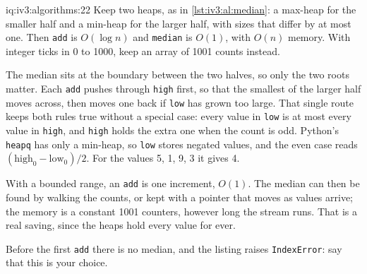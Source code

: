 \begin{solution}{iq:iv3:algorithms:22}
Keep two heaps, as in \cref{lst:iv3:al:median}: a max-heap for the smaller half and a min-heap for the larger half, with sizes that differ by at most one. Then \texttt{add} is $O(\log n)$ and \texttt{median} is $O(1)$, with $O(n)$ memory. With integer ticks in 0 to 1000, keep an array of 1001 counts instead.
\label{lst:iv3:al:median}

The median sits at the boundary between the two halves, so only the two roots matter. Each \texttt{add} pushes through \texttt{high} first, so that the smallest of the larger half moves across, then moves one back if \texttt{low} has grown too large. That single route keeps both rules true without a special case: every value in \texttt{low} is at most every value in \texttt{high}, and \texttt{high} holds the extra one when the count is odd. Python's \texttt{heapq} has only a min-heap, so \texttt{low} stores negated values, and the even case reads $(\text{high}_0 - \text{low}_0) / 2$. For the values 5, 1, 9, 3 it gives 4.

With a bounded range, an \texttt{add} is one increment, $O(1)$. The median can then be found by walking the counts, or kept with a pointer that moves as values arrive; the memory is a constant 1001 counters, however long the stream runs. That is a real saving, since the heaps hold every value for ever.

Before the first \texttt{add} there is no median, and the listing raises \texttt{IndexError}: say that this is your choice.

\end{solution}

